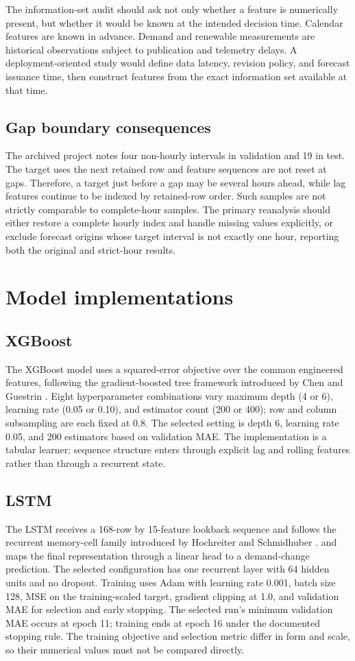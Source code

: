 \documentclass[12pt,a4paper]{article}
\begin{document}
The information-set audit should ask not only whether a feature is numerically present, but whether it would be known at the intended decision time. Calendar features are known in advance. Demand and renewable measurements are historical observations subject to publication and telemetry delays. A deployment-oriented study would define data latency, revision policy, and forecast issuance time, then construct features from the exact information set available at that time.

\subsection{Gap boundary consequences}
The archived project notes four non-hourly intervals in validation and 19 in test. The target uses the next retained row and feature sequences are not reset at gaps. Therefore, a target just before a gap may be several hours ahead, while lag features continue to be indexed by retained-row order. Such samples are not strictly comparable to complete-hour samples. The primary reanalysis should either restore a complete hourly index and handle missing values explicitly, or exclude forecast origins whose target interval is not exactly one hour, reporting both the original and strict-hour results.

\newpage
\section{Model implementations}
\subsection{XGBoost}
The XGBoost model uses a squared-error objective over the common engineered features, following the gradient-boosted tree framework introduced by Chen and Guestrin \cite{xgboost}. Eight hyperparameter combinations vary maximum depth (4 or 6), learning rate (0.05 or 0.10), and estimator count (200 or 400); row and column subsampling are each fixed at 0.8. The selected setting is depth 6, learning rate 0.05, and 200 estimators based on validation MAE. The implementation is a tabular learner: sequence structure enters through explicit lag and rolling features rather than through a recurrent state.

\subsection{LSTM}
The LSTM receives a 168-row by 15-feature lookback sequence and follows the recurrent memory-cell family introduced by Hochreiter and Schmidhuber \cite{lstm}. and maps the final representation through a linear head to a demand-change prediction. The selected configuration has one recurrent layer with 64 hidden units and no dropout. Training uses Adam with learning rate 0.001, batch size 128, MSE on the training-scaled target, gradient clipping at 1.0, and validation MAE for selection and early stopping. The selected run's minimum validation MAE occurs at epoch 11; training ends at epoch 16 under the documented stopping rule. The training objective and selection metric differ in form and scale, so their numerical values must not be compared directly.
\end{document}
